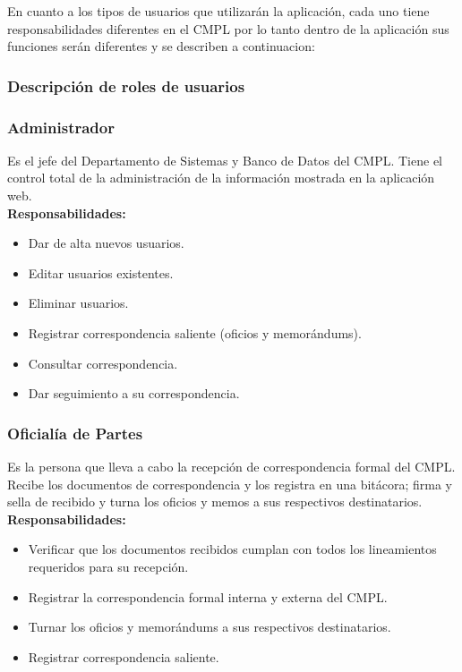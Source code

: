 En cuanto a los tipos de usuarios que utilizarán la aplicación, cada uno tiene responsabilidades diferentes en el CMPL por lo tanto dentro de la aplicación sus funciones serán diferentes y se describen a continuacion: \\
\subsubsection{Descripción de roles de usuarios}

\subsubsection{Administrador}
Es el jefe del Departamento de Sistemas y Banco de Datos del CMPL. Tiene el control total de la administración de la información mostrada en la aplicación web.\\

\textbf{Responsabilidades:}
\begin{itemize}
	\item Dar de alta nuevos usuarios.
	\item Editar usuarios existentes.
	\item Eliminar usuarios.
	\item Registrar correspondencia saliente (oficios y memorándums).
	\item Consultar correspondencia.
	\item Dar seguimiento a su correspondencia.
\end{itemize}

\subsubsection{Oficialía de Partes}
Es la persona que lleva a cabo la recepción de correspondencia formal del CMPL. Recibe los documentos de correspondencia y los registra en una bitácora; firma y sella de recibido y turna los oficios y memos a sus respectivos destinatarios.\\

\textbf{Responsabilidades:}
\begin{itemize}
	\item Verificar que los documentos recibidos cumplan con todos los lineamientos requeridos para su recepción.
	\item Registrar la correspondencia formal interna y externa del CMPL.
	\item Turnar los oficios y memorándums a sus respectivos destinatarios.
	\item Registrar correspondencia saliente.
\end{itemize}


